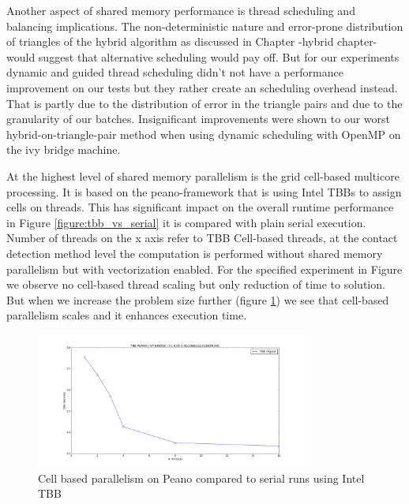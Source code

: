 Another aspect of shared memory performance is thread scheduling and balancing implications.
The non-deterministic nature and error-prone distribution of triangles of the hybrid algorithm as discussed in Chapter {-hybrid chapter-} would suggest that alternative scheduling would pay off. But for our experiments dynamic and guided thread scheduling didn't not have a performance improvement on our tests but they rather create an scheduling overhead instead. That is partly due to the distribution of error in the triangle pairs and due to the granularity of our batches. Insignificant improvements were shown to our worst hybrid-on-triangle-pair method when using dynamic scheduling with OpenMP on the ivy bridge machine.    

At the highest level of shared memory parallelism is the grid cell-based multicore processing. It is based on the peano-framework that is using Intel TBBs to assign cells on threads. This has significant impact on the overall runtime performance in Figure \ref{figure:tbb_vs_serial} it is compared with plain serial execution. Number of threads on the x axis refer to TBB Cell-based threads, at the contact detection method level the computation is performed without shared memory parallelism but with vectorization enabled. For the specified experiment in Figure {} we observe no cell-based thread scaling but only reduction of time to solution. But when we increase the problem size further (figure \ref{figure:tbb_scaling}) we see that cell-based parallelism scales and it enhances execution time. 

\begin{figure}[htb]
  \begin{center}
    \includegraphics[width=0.8\textwidth]{experiments/random/omp/tbb_regular_x2.png}
  \end{center}
  \caption{Cell based parallelism on Peano compared to serial runs using Intel TBB}
  \label{figure:tbb_scaling}
\end{figure}

